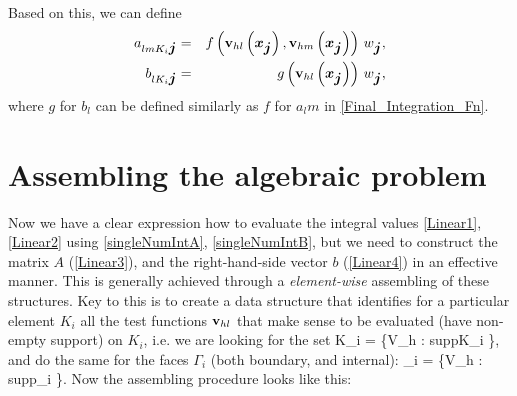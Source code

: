 Based on this, we can define
\begin{eqnarray}
\label{singleNumIntA}
a_{lm K_i \mbox{\boldmath $j$}} & = & f\left(\mathrm{\mathbf{v}}_{hl}\left(\mbox{\boldmath $x$}_{\mbox{\boldmath $j$}}\right), \mathrm{\mathbf{v}}_{hm}\left(\mbox{\boldmath $x$}_{\mbox{\boldmath $j$}}\right)\right)\,w_{\mbox{\boldmath $j$}},\\
\label{singleNumIntB}
b_{l K_i \mbox{\boldmath $j$}} & = & g\left(\mathrm{\mathbf{v}}_{hl}\left(\mbox{\boldmath $x$}_{\mbox{\boldmath $j$}}\right)\right)\,w_{\mbox{\boldmath $j$}},
\end{eqnarray}
where $g$ for $b_l$ can be defined similarly as $f$ for $a_lm$ in \ref{Final_Integration_Fn}.

\section{Assembling the algebraic problem}
Now we have a clear expression how to evaluate the integral values \ref{Linear1}, \ref{Linear2} using \ref{singleNumIntA}, \ref{singleNumIntB}, but we need to construct the matrix $A$ (\ref{Linear3}), and the right-hand-side vector $b$ (\ref{Linear4}) in an effective manner.
This is generally achieved through a \textit{element-wise} assembling of these structures. Key to this is to create a data structure that identifies for a particular element $K_i$ all the test functions $\mathrm{\mathbf{v}}_{hl}$ that make sense to be evaluated (have non-empty support) on $K_i$, i.e. we are looking for the set
\be
\mrvh \lo K_i \ro = \left\{\mrvh \in V_h : supp\lo\mrvh\ro \cap K_i \neq \emptyset \right\},
\ee
and do the same for the faces $\Gamma_i$ (both boundary, and internal):
\be
\mrvh \lo \Gamma_i \ro = \left\{\mrvh \in V_h : supp\lo\mrvh\ro \cap \Gamma_i \neq \emptyset \right\}.
\ee
Now the assembling procedure looks like this:\\

